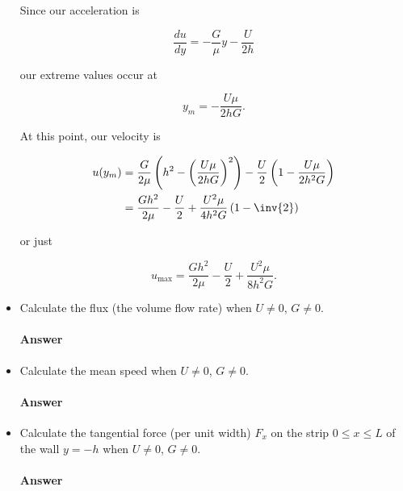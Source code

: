 \begin{itemize}
Since our acceleration is

\begin{equation}\label{eqn:continuumMidTermReflection:690}
\frac{du}{dy} = -\frac{G}{\mu} y - \frac{U}{2 h}
\end{equation}

our extreme values occur at 

\begin{equation}\label{eqn:continuumMidTermReflection:710}
y_m = -\frac{U \mu}{2 h G}.
\end{equation}

At this point, our velocity is

\begin{align*}
u(y_m) 
&= 
\frac{G}{2 \mu} \left(h^2 - 
\left( \frac{U \mu}{2 h G} \right)^2
\right) - \frac{U}{2} \left( 1 
-\frac{U \mu}{2 h^2 G}
\right) \\
&=
\frac{G h^2}{2 \mu} -\frac{U}{2}
+ \frac{U^2 \mu}{4 h^2 G} \left(
1 -\inv{2}
\right)
\end{align*}

or just

\begin{equation}\label{eqn:continuumMidTermReflection:730}
u_{\text{max}} = \frac{G h^2}{2 \mu} -\frac{U}{2} + \frac{U^2 \mu}{8 h^2 G}.
\end{equation}

\item Calculate the flux (the volume flow rate) when $U \ne 0$, $G \ne 0$.
\paragraph{Answer}


\item Calculate the mean speed when $U \ne 0$, $G \ne 0$.
\paragraph{Answer}
\item Calculate the tangential force (per unit width) $F_x$ on the strip $0 \le x \le L$ of the wall $y = -h$ when $U \ne 0$, $G \ne 0$.
\paragraph{Answer}
\end{itemize}

\EndArticle
